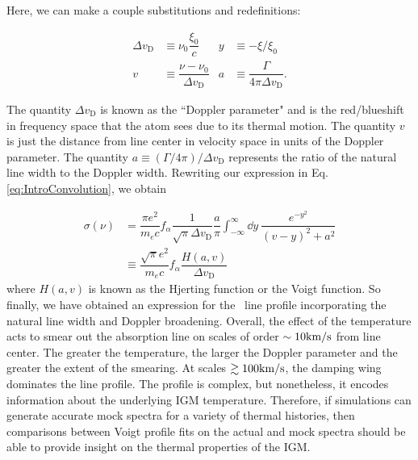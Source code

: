 Here, we can make a couple substitutions and redefinitions:

\begin{align}
\Delta v_{\text{D}} &\equiv \nu_{0}\dfrac{\xi_{0}}{c} & y &\equiv -\xi/\xi_0 \\
v &\equiv \dfrac{\nu - \nu_{0}}{\Delta v_{\text{D}}} & a &\equiv \dfrac{\Gamma}{4\pi \Delta v_{\text{D}}}.
\end{align}

The quantity $\Delta v_{\text{D}}$ is known as the ``Doppler parameter" and is the red/blueshift in frequency space that the atom sees due to its thermal motion. The quantity $v$ is just the distance from line center in velocity space in units of the Doppler parameter. The quantity $a \equiv (\Gamma/4\pi)/\Delta v_{\text{D}}$ represents the ratio of the natural line width to the Doppler width. Rewriting our expression in Eq. \ref{eq:IntroConvolution}, we obtain

\begin{align}
\sigma(\nu) &= \dfrac{\pi e^2}{m_e c}f_{\alpha}\dfrac{1}{\sqrt{\pi}\Delta v_{\text{D}}} \dfrac{a}{\pi}\int_{-\infty}^{\infty}\dd y\ \dfrac{e^{-y^2}}{(v-y)^2+a^2}\\ 
&\equiv \dfrac{\sqrt{\pi} e^2}{m_e c} f_{\alpha}\dfrac{H(a,v)}{\Delta v_{\text{D}}}
\end{align}
where $H(a,v)$ is known as the Hjerting function  or the Voigt function. So finally, we have obtained an expression for the \lya\ line profile incorporating the natural line width and Doppler broadening. Overall, the effect of the temperature acts to smear out the absorption line on scales of order $\sim 10\text{km}/\text{s}$ from line center. The greater the temperature, the larger the Doppler parameter and the greater the extent of the smearing. At scales $\gtrsim 100\text{km}/\text{s}$, the damping wing dominates the line profile. The profile is complex, but nonetheless, it encodes information about the underlying IGM temperature. Therefore, if simulations can generate accurate mock spectra for a variety of thermal histories, then comparisons between Voigt profile fits on the actual and mock spectra should be able to provide insight on the thermal properties of the IGM. 


